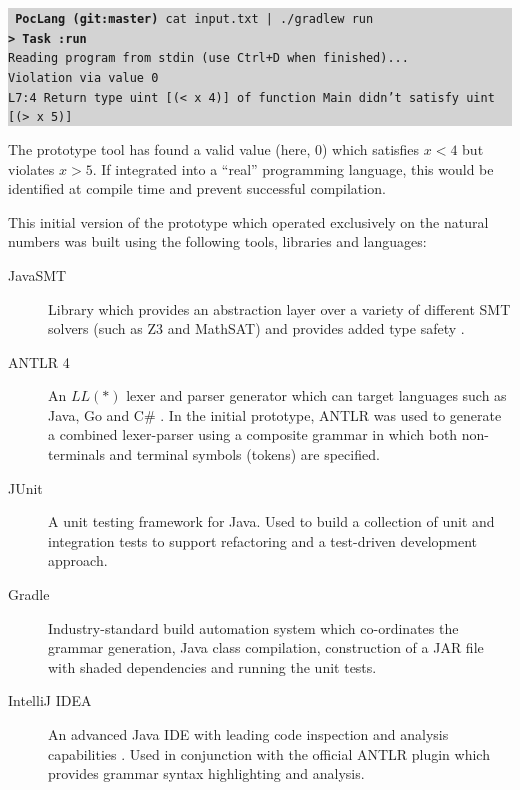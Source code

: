 \documentclass[a4paper]{article}
\newcommand{\termbox}[1] {\colorbox{lightgrey}{\parbox{\textwidth}{\vspace{.75\baselineskip}\centering\parbox{0.95\textwidth}{ \sffamily#1\vspace{.75\baselineskip}}}}}
\begin{document}
    \termbox{
        \texttt{\textcolor{term-green}{\fallbackmono{➜}} \ttfamily \textbf{\textcolor{term-dir}{PocLang} \textcolor{term-git}{(git:}\textcolor{term-branch}{master}\textcolor{term-git}{)}} cat input.txt | ./gradlew run}\\
        \texttt{\textbf{> Task :run}}\\
        \textcolor{term-green}{\texttt{Reading program from stdin (use Ctrl+D when finished)...}}\\
        \textcolor{id7-ruby-red}{\texttt{Violation via value 0}}\\
        \textcolor{id7-ruby-red}{\texttt{L7:4 Return type uint [(< x 4)] of function Main didn't satisfy uint [(> x 5)]}}
    }
    
    The prototype tool has found a valid value (here, $0$) which satisfies $x < 4$ but violates $x > 5$. If integrated into a ``real'' programming language, this would be identified at compile time and prevent successful compilation.
    
    This initial version of the prototype which operated exclusively on the natural numbers was built using the following tools, libraries and languages:
    
    \begin{description}
        \item[JavaSMT] Library which provides an abstraction layer over a variety of different SMT solvers (such as Z3 and MathSAT) and provides added type safety \citep{karpenkov2016javasmt}.
        \item[ANTLR 4] An $LL(*)$ lexer and parser generator which can target languages such as Java, Go and C\# \citep{parr2011ll}. In the initial prototype, ANTLR was used to generate a combined lexer-parser using a composite grammar in which both non-terminals and terminal symbols (tokens) are specified.
        \item[JUnit] A unit testing framework for Java. Used to build a collection of unit and integration tests to support refactoring and a test-driven development approach.
        \item[Gradle] Industry-standard build automation system which co-ordinates the grammar generation, Java class compilation, construction of a JAR file with shaded dependencies and running the unit tests.
        \item[IntelliJ IDEA] An advanced Java IDE with leading code inspection and analysis capabilities \citep{ideainspections} \citep{Jemerov:2008:IRI:1636642.1636655}. Used in conjunction with the official ANTLR plugin which provides grammar syntax highlighting and analysis.
    \end{description}
\end{document}
